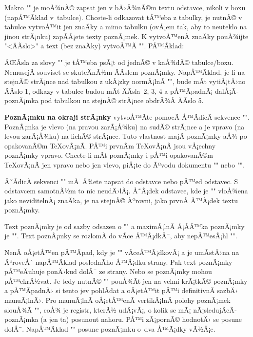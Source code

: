 Makro "\fnote" je moÅ¾nÃ© zapsat jen v bÄ›Å¾nÃ©m textu odstavce, nikoli v boxu
(napÅ™Ã­klad v~tabulce). Chcete-li odkazovat tÅ™eba z tabulky, je nutnÃ© v
tabulce vytvoÅ™it jen znaÄky a mimo tabulku (ovÅ¡em tak, aby to neuteklo na
jinou strÃ¡nku) zapÃ­Å¡ete texty poznÃ¡mek. K vytvoÅ™enÃ­ znaÄky pouÅ¾ijte
"\fnotemark<ÄÃ­slo>" a text (bez znaÄky) vytvoÅ™Ã­ "".
PÅ™Ã­klad:

\begtt
{\typoscale[/1200]}
\par\nobreak {}
\endtt
%
ÄŒÃ­sla za slovy "\fnotemark" je tÅ™eba psÃ¡t od jednÃ© v kaÅ¾dÃ© tabulce/boxu.
NemusejÃ­ souviset se skuteÄnÃ½m ÄÃ­slem poznÃ¡mky. NapÅ™Ã­klad, je-li na stejnÃ© strÃ¡nce nad 
tabulkou z ukÃ¡zky normÃ¡lnÃ­ "\fnote", bude mÃ­t vytiÅ¡tÄ›no ÄÃ­slo 1, 
odkazy v tabulce budou mÃ­t ÄÃ­sla~2, 3, 4 a pÅ™Ã­padnÃ¡ dalÅ¡Ã­ poznÃ¡mka pod
tabulkou na stejnÃ© strÃ¡nce obdrÅ¾Ã­ ÄÃ­slo 5.

{\bf PoznÃ¡mku na okraji strÃ¡nky} vytvoÅ™Ã­te pomocÃ­ Å™Ã­dicÃ­ sekvence
"". PoznÃ¡mka je vlevo (na pravou zarÃ¡Å¾ku) na sudÃ© strÃ¡nce a je
vpravo (na levou zarÃ¡Å¾ku) na lichÃ© strÃ¡nce. Tuto vlastnost majÃ­ poznÃ¡mky aÅ¾
po opakovanÃ©m \TeX{}ovÃ¡nÃ­. PÅ™i prvnÃ­m \TeX{}ovÃ¡nÃ­ jsou vÅ¡echny poznÃ¡mky vpravo.
Chcete-li mÃ­t poznÃ¡mky i pÅ™i opakovanÃ©m \TeX{}ovÃ¡nÃ­ jen vpravo nebo jen
vlevo, piÅ¡te do Ãºvodu dokumentu "\fixmnotes\right" nebo "\fixmnotes\left".

Å˜Ã­dicÃ­ sekvenci "" mÅ¯Å¾ete napsat do odstavce nebo pÅ™ed
odstavec. S odstavcem samotnÃ½m to nic neudÄ›lÃ¡. Å˜Ã¡dek odstavce, kde je
"\mnote" vloÅ¾ena jako neviditelnÃ¡ znaÄka, je na stejnÃ© Ãºrovni, jako prvnÃ­
Å™Ã¡dek textu poznÃ¡mky. 

Text poznÃ¡mky je od sazby odsazen o "\mnoteindent" a maximÃ¡lnÃ­ Å¡Ã­Å™ka
poznÃ¡mky je "\mnotesize". Text poznÃ¡mky se rozlomÃ­ do vÃ­ce Å™Ã¡dkÅ¯, aby
nepÅ™esÃ¡hl "\mnotesize".

NenÃ­ oÅ¡etÅ™en pÅ™Ã­pad, kdy je "\mnote" vÃ­ceÅ™Ã¡dkovÃ¡ a je umÃ­stÄ›na na ÃºroveÅˆ
napÅ™Ã­klad poslednÃ­ho Å™Ã¡dku strany. Pak text poznÃ¡mky pÅ™eÄuhuje ponÄ›kud 
dolÅ¯ ze strany. Nebo se poznÃ¡mky mohou pÅ™ekrÃ½vat. 
Je tedy nutnÃ© "\mnote" pouÅ¾Ã­t jen na velmi krÃ¡tkÃ© poznÃ¡mky a
pÅ™Ã­padnÄ› si tento jev pohlÃ­dat a oÅ¡etÅ™it pÅ™i definitivnÃ­ sazbÄ› manuÃ¡lnÄ›.
Pro manuÃ¡lnÃ­ oÅ¡etÅ™enÃ­ vertikÃ¡lnÃ­ polohy poznÃ¡mek slouÅ¾Ã­ "\mnoteskip", coÅ¾ je
registr, kterÃ½ udÃ¡vÃ¡, o kolik se mÃ¡ nÃ¡sledujÃ­cÃ­ poznÃ¡mka (a jen ta) posunout
nahoru. PÅ™i zÃ¡pornÃ© hodnotÄ› se posune dolÅ¯. NapÅ™Ã­klad 
"\baselineskip {}" posune poznÃ¡mku o~dva Å™Ã¡dky vÃ½Å¡e.


